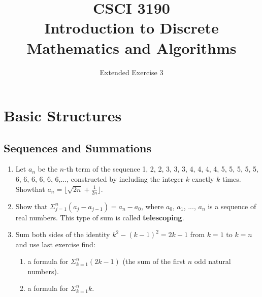 \documentclass{sig-alternate-05-2015}
\begin{document}






%

\title{CSCI 3190 \\ Introduction to Discrete Mathematics and Algorithms}
\subtitle{Extended Exercise 3}

\maketitle
\begin{abstract}

\end{abstract}

\keywords{}

\section{Basic Structures}
\subsection{Sequences and Summations}
\begin{enumerate}
\item Let $a_n$ be the $n$-th term of the sequence 1, 2, 2, 3, 3, 3, 4, 4, 4, 4, 5, 5, 5, 5, 5, 6, 6, 6, 6, 6, 6,..., constructed by including the integer $k$ exactly $k$ times. Showthat $a_n = \lfloor \sqrt{2n}+ \frac{1}{2n} \rfloor$.

\item Show that $\Sigma^n_{j = 1}(a_j - a_{j - 1}) = a_n - a_0$, where
$a_0$, $a_1$, ..., $a_n$ is a sequence of real numbers. This type of sum is called \textbf{telescoping}.

\item Sum both sides of the identity $k^2 - (k - 1)^2 = 2k - 1$ from $k = 1$ to $k = n$ and use last exercise find:
\begin{enumerate}
	\item a formula for $\Sigma^n_{k = 1}(2k - 1)$ (the sum of the first $n$ odd natural numbers).
	\item a formula for $\Sigma^n_{k = 1} k$.
\end{enumerate}

\end{enumerate}
\end{document}
